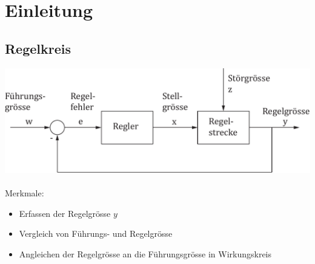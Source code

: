 



\chapter{Einleitung}

\section{Regelkreis}
\includegraphics[width = \linewidth]{images/regelkreis.pdf}
\\\\
Merkmale:
\begin{itemize}
	\item Erfassen der Regelgrösse $y$
	\item Vergleich von Führungs- und Regelgrösse
	\item Angleichen der Regelgrösse an die Führungsgrösse in Wirkungskreis
\end{itemize}


